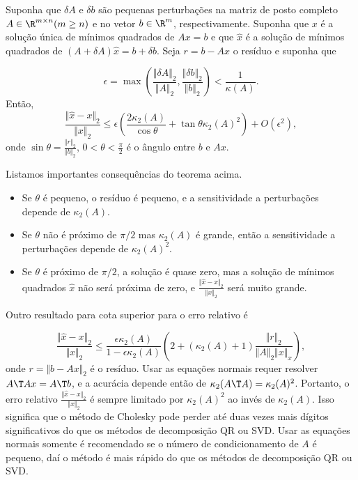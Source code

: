 \documentclass{article}
\begin{document}
\begin{thm}
    Suponha que \(\delta A\) e \(\delta b\) são pequenas perturbações na matriz de posto completo \(A \in \R^{m \times n} (m \geq n)\) e no vetor \(b \in \R^m\), respectivamente. Suponha que \(x\) é a solução única de mínimos quadrados de \(Ax=b\) e que \(\hat{x}\) é a solução de mínimos quadrados de \((A+\delta A)\hat{x} = b + \delta b\). Seja \(r=b-Ax\) o resíduo e suponha que

    \[
        \epsilon = \max \left(\frac{\Vert \delta A \Vert_2}{\Vert A \Vert_2}, \frac{\Vert \delta b \Vert_2}{\Vert b \Vert_2}\right) < \frac{1}{\kappa(A)}.
    \] Então,
    \[
        \frac{\Vert \hat{x} - x \Vert_2}{\Vert x \Vert_2} \leq \epsilon\left(\frac{2\kappa_2(A)}{\cos \theta} + \tan \theta \kappa_2(A)^2\right) + O(\epsilon^2),
    \] onde \(\sin\theta = \frac{\Vert r \Vert_2}{\Vert b \Vert_2}\), \(0 < \theta < \frac{\pi}{2}\) é o ângulo entre \(b\) e \(Ax\).
\end{thm}

Listamos importantes consequências do teorema acima.

\begin{itemize}
    \item Se \(\theta\) é pequeno, o resíduo é pequeno, e a sensitividade a perturbações depende de \(\kappa_2(A)\).
    \item Se \(\theta\) não é próximo de \(\pi/2\) mas \(\kappa_2(A)\) é grande, então a sensitividade a perturbações depende de \(\kappa_2(A)^2\).
    \item Se \(\theta\) é próximo de \(\pi/2\), a solução é quase zero, mas a solução de mínimos quadrados \(\hat{x}\) não será próxima de zero, e \(\frac{\Vert \hat{x} - x \Vert_2}{\Vert x \Vert_2}\) será muito grande.
\end{itemize}

Outro resultado para cota superior para o erro relativo é

\begin{equation}
    \frac{\Vert \hat{x} - x \Vert_2}{\Vert x \Vert_2} \leq \frac{\epsilon \kappa_2(A)}{1-\epsilon \kappa_2(A)}\left(2 + (\kappa_2(A) + 1)\frac{\Vert r \Vert_2}{\Vert A \Vert_2 \Vert x \Vert_x}\right),
\end{equation} onde \(r = \Vert b-Ax \Vert_2\) é o resíduo. Usar as equações normais requer resolver \(A\T Ax = A\T b\), e a acurácia depende então de \(\kappa_2(A\T A) = \kappa_2(A)^2\). Portanto, o erro relativo \(\frac{\Vert \hat{x} - x \Vert_2}{\Vert x \Vert_2}\) é sempre limitado por \(\kappa_2(A)^2\) ao invés de \(\kappa_2(A)\). Isso significa que o método de Cholesky pode perder até duas vezes mais dígitos significativos do que os métodos de decomposição QR ou SVD. Usar as equações normais somente é recomendado se o número de condicionamento de \(A\) é pequeno, daí o método é mais rápido do que os métodos de decomposição QR ou SVD.
\end{document}
